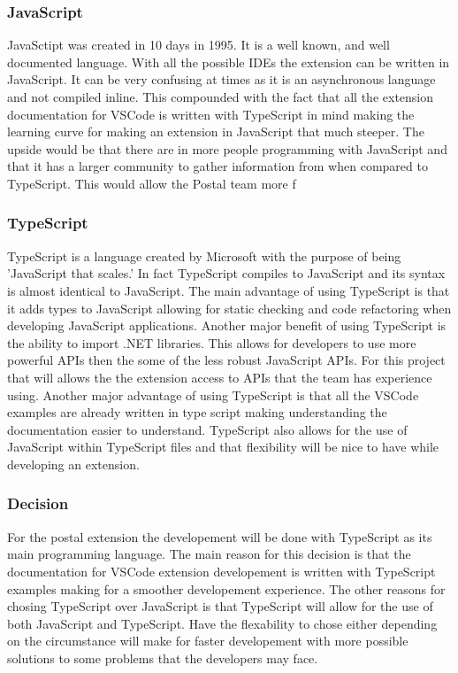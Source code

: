 \documentclass[letterpaper,10pt,titlepage,draftclsnofoot,onecolumn,onesided] {IEEEtran}
\begin{document}
\subsubsection{JavaScript}
JavaSctipt was created in 10 days in 1995.\cite{JavaScriptHistory}
It is a well known, and well documented language. 
With all the possible IDEs the extension can be written in JavaScript. 
It can be very confusing at times as it is an asynchronous language and not compiled inline.
This compounded with the fact that all the extension documentation for VSCode is written with TypeScript in mind making the learning curve for making an extension in JavaScript that much steeper.
The upside would be that there are in more people programming with JavaScript and that it has a larger community to gather information from when compared to TypeScript. 
This would allow the Postal team more f

\subsubsection{TypeScript}
TypeScript is a language created by Microsoft with the purpose of being 'JavaScript that scales.' \cite{TypeScript}
In fact TypeScript compiles to JavaScript and its syntax is almost identical to JavaScript. 
The main advantage of using TypeScript is that it adds types to JavaScript allowing for static checking and code refactoring when developing JavaScript applications. \cite{TypeScript}
Another major benefit of using TypeScript is the ability to import .NET libraries. 
This allows for developers to use more powerful APIs then the some of the less robust JavaScript APIs. 
For this project that will allows the the extension access to APIs that the team has experience using.
Another major advantage of using TypeScript is that all the VSCode examples are already written in type script making understanding the documentation easier to understand. 
TypeScript also allows for the use of JavaScript within TypeScript files and that flexibility will be nice to have while developing an extension.

\subsubsection{Decision}
For the postal extension the developement will be done with TypeScript as its main programming language. 
The main reason for this decision is that the documentation for VSCode extension developement is written with TypeScript examples making for a smoother developement experience. 
The other reasons for chosing TypeScript over JavaScript is that TypeScript will allow for the use of both JavaScript and TypeScript. 
Have the flexability to chose either depending on the circumstance will make for faster developement with more possible solutions to some problems that the developers may face. 
\end{document}
